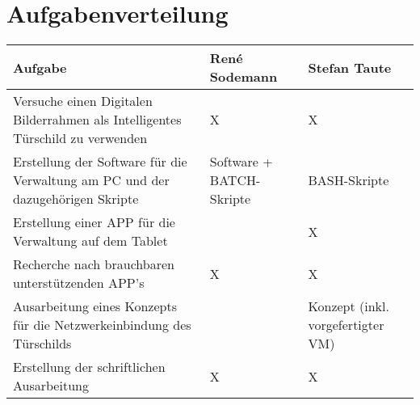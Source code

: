 
\chapter*{Aufgabenverteilung}

\begin{center}
\begin{tabular}[t]{|>{\centering\arraybackslash}p{}|>{\centering\arraybackslash}p{}|>{\centering\arraybackslash}p{}|}
\hline
Aufgabe & René Sodemann & Stefan Taute\\
\hline
Versuche einen Digitalen Bilderrahmen als Intelligentes Türschild zu verwenden & X & X\\
\hline
Erstellung der Software für die Verwaltung am PC und der dazugehörigen Skripte & Software + BATCH-Skripte & BASH-Skripte\\
\hline
Erstellung einer APP für die Verwaltung auf dem Tablet &  & X\\
\hline
Recherche nach brauchbaren unterstützenden APP's & X & X\\
\hline
Ausarbeitung eines Konzepts für die Netzwerkeinbindung des Türschilds &  & Konzept (inkl. vorgefertigter VM)\\
\hline
Erstellung der schriftlichen Ausarbeitung & X & X\\
\hline
\end{tabular}
\end{center}

